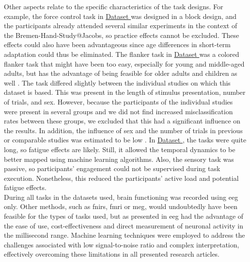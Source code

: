 Other aspects relate to the specific characteristics of the task designs. For example, the force control task in \hyperref[methods:datasets:I]{Dataset } was designed in a block design, and the participants already attended several similar experiments in the context of the Bremen-Hand-Study@Jacobs, so practice effects cannot be excluded. These effects could also have been advantageous since age differences in short-term adaptation could thus be eliminated. The flanker task in \hyperref[methods:datasets:II]{Dataset } was a colored flanker task that might have been too easy, especially for young and middle-aged adults, but has the advantage of being feasible for older adults and children as well \cite{Reuter2019}. The task differed slightly between the individual studies on which this dataset is based. This was present in the length of stimulus presentation, number of trials, and sex. However, because the participants of the individual studies were present in several groups and we did not find increased misclassification rates between these groups, we excluded that this had a significant influence on the results. In addition, the influence of sex and the number of trials in previous or comparable studies was estimated to be low \cite{Reuter2019, Vahid2020}. In \hyperref[methods:datasets:III]{Dataset }, the tasks were quite long, so fatigue effects are likely. Still, it allowed the temporal dynamics to be better mapped using machine learning algorithms. Also, the sensory task was passive, so participants' engagement could not be supervised during task execution. Nonetheless, this reduced the participants' active load and potential fatigue effects.\\
During all tasks in the datasets used, brain functioning was recorded using \gls{eeg} only. Other methods, such as \gls{fnirs}, \gls{fmri} or \gls{meg}, would undoubtedly have been feasible for the types of tasks used, but as presented in  \gls{eeg} had the advantage of the ease of use, cost-effectiveness and direct measurement of neuronal activity in the millisecond range. Machine learning techniques were employed to address the challenges associated with low signal-to-noise ratio and complex interpretation, effectively overcoming these limitations in all presented research articles.

